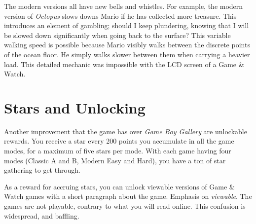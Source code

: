 \documentclass{book}
\let\oldcenter\center
\let\oldendcenter\endcenter
\renewenvironment{center}{\setlength\topsep{0pt}\oldcenter}{\oldendcenter}
\begin{document}
\begin{center}
\quad\vspace{4pt}
\quad\vspace{4pt}
\quad\vspace{4pt}
\end{center}

The modern versions all have new bells and whistles. For example, the modern version of \emph{Octopus} slows downs Mario if he has collected more treasure. This introduces an element of gambling; should I keep plundering, knowing that I will be slowed down significantly when going back to the surface? This variable walking speed is possible because Mario visibly walks between the discrete points of the ocean floor. He simply walks slower between them when carrying a heavier load. This detailed mechanic was impossible with the LCD screen of a Game \& Watch.

\FloatBarrier\needspace{5pt}\section*{Stars and Unlocking}\nopagebreak[4]

Another improvement that the game has over \emph{Game Boy Gallery} are unlockable rewards. You receive a star every 200 points you accumulate in all the game modes, for a maximum of five stars per mode. With each game having four modes (Classic A and B, Modern Easy and Hard), you have a ton of star gathering to get through.

As a reward for accruing stars, you can unlock viewable versions of Game \& Watch games with a short paragraph about the game. Emphasis on \emph{viewable}. The games are not playable, contrary to what you will read online. This confusion is widespread, and baffling.
\end{document}
